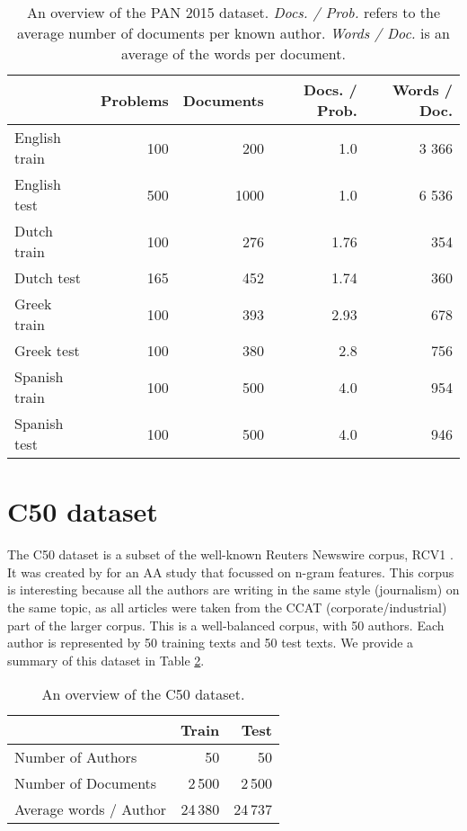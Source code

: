 \begin{table}[!ht]
\small
\caption{\label{tab:pan15data}An overview of the PAN 2015 dataset. \textit{Docs. / Prob.} refers to the average number of documents per known author. \textit{Words / Doc.} is an average of the words per document.}
\begin{center}
\begin{tabular}{lrrrr}
\toprule
& \bf Problems & \bf Documents &\bf Docs. / Prob. & \bf Words / Doc. \\
\midrule
English train & 100 & 200 & 1.0 & 3 366\\
English test & 500 & 1000 & 1.0 & 6 536 \\
Dutch train & 100& 276   & 1.76 & 354   \\
Dutch test  & 165 & 452  & 1.74 & 360   \\
Greek train & 100& 393 & 2.93 & 678\\
Greek test  & 100 & 380 & 2.8 & 756\\
Spanish train & 100& 500 & 4.0 & 954 \\
Spanish test & 100 & 500 & 4.0 & 946 \\
\bottomrule
\end{tabular}
\end{center}
\end{table}


\section{C50 dataset}
The C50 dataset \cite{houvardas2006ngram} is a subset of the well-known Reuters Newswire corpus, RCV1 \cite{lewis2004rcv1}. It was created by \citet{houvardas2006ngram} for an AA study that focussed on n-gram features. This corpus is interesting because all the authors are writing in the same style (journalism) on the same topic, as all articles were taken from the CCAT (corporate/industrial) part of the larger corpus. This is a well-balanced corpus, with 50 authors. Each author is represented by 50 training texts and 50 test texts. We provide a summary of this dataset in Table \ref{tab:c50data}.

\begin{table}[!ht]
\caption{\label{tab:c50data}An overview of the C50 dataset.}
\begin{center}
\begin{tabular}{lrr}
\toprule
& \bf Train & \bf Test            \\
\midrule
Number of Authors & 50 & 50               \\
Number of Documents & 2\,500 & 2\,500         \\
Average words / Author & 24\,380 & 24\,737  \\
\bottomrule
\end{tabular}
\end{center}
\end{table}

